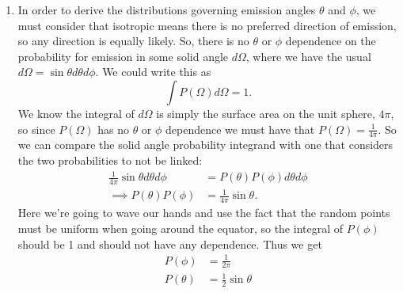 \documentclass[11pt]{article}
\begin{document}
\begin{enumerate}
\begin{enumerate}
\begin{enumerate}
            \item The average $p$ was found to be \SI{5.9985}{\mega\electronvolt}.
            
        \end{enumerate}

        \item In order to derive the distributions governing emission angles $\theta$ and $\phi$, we must consider that isotropic means there is no preferred direction of emission, so any direction is equally likely. So, there is no $\theta$ or $\phi$ dependence on the probability for emission in some solid angle $d\Omega$, where we have the usual $d\Omega=\sin\theta d\theta d\phi$. We could write this as 
        \begin{equation*}
            \int P(\Omega)d\Omega = 1.
        \end{equation*}
        We know the integral of $d\Omega$ is simply the surface area on the unit sphere, $4\pi$, so since $P(\Omega)$ has no $\theta$ or $\phi$ dependence we must have that $P(\Omega)=\frac{1}{4\pi}$. So we can compare the solid angle probability integrand with one that considers the two probabilities to not be linked:
        \begin{align*}
            \frac{1}{4\pi}\sin\theta d\theta d\phi&=P(\theta)P(\phi)d\theta d\phi \\
            \implies P(\theta)P(\phi)&=\frac{1}{4\pi}\sin\theta.
        \end{align*}
        Here we're going to wave our hands and use the fact that the random points must be uniform when going around the equator, so the integral of $P(\phi)$ should be 1 and should not have any dependence. Thus we get 
        \begin{align*}
            P(\phi)&=\frac{1}{2\pi}\\
            P(\theta)&=\frac{1}{2}\sin\theta
        \end{align*}
        

\end{enumerate}
\end{enumerate}
\end{document}
